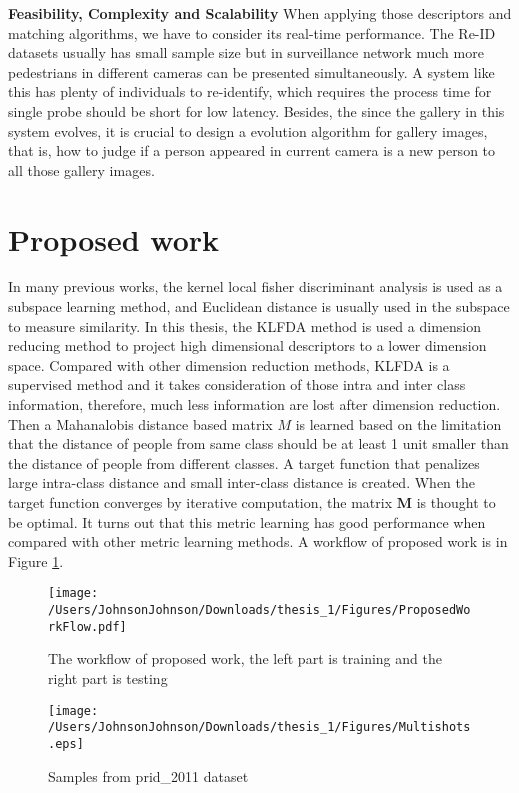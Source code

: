 \textbf{Feasibility, Complexity and Scalability} When applying those descriptors and matching algorithms, we have to consider its real-time performance. The Re-ID datasets usually has small sample size but in surveillance network much more pedestrians in different cameras can be presented simultaneously. A system like this has plenty of individuals to re-identify, which requires the process time for single probe should be short for low latency. Besides, the since the gallery in this system evolves, it is crucial to design a evolution algorithm for gallery images, that is, how to judge if a person appeared in current camera is a new person to all those gallery images.

\section{Proposed work}
In many previous works, the kernel local fisher discriminant analysis is used as a subspace learning method, and Euclidean distance is usually used in the subspace to measure similarity. In this thesis, the KLFDA \cite{KLFDA} method is used a dimension reducing method to project high dimensional descriptors to a lower dimension space. Compared with other dimension reduction methods, KLFDA is a supervised method and it takes consideration of those intra and inter class information, therefore, much less information are lost after dimension reduction. Then a Mahanalobis distance based matrix $M$ is learned based on the limitation that the distance of people from same class should be at least 1 unit smaller than the distance of people from different classes. A target function that penalizes large intra-class distance and small inter-class distance is created. When the target function converges by iterative computation, the matrix $\bm{M}$ is thought to be optimal. It turns out that this metric learning has good performance when compared with other metric learning methods. A workflow of proposed work is in Figure \ref{ProposedWorkflow}.

\begin{figure}[H]

\texttt{[image: /Users/JohnsonJohnson/Downloads/thesis\_1/Figures/ProposedWorkFlow.pdf]}
\vspace{-2em}
\caption{The workflow of proposed work, the left part is training and the right part is testing}
\label{ProposedWorkflow}

\end{figure}
\begin{figure}[H]

\texttt{[image: /Users/JohnsonJohnson/Downloads/thesis\_1/Figures/Multishots.eps]}
\vspace{-2em}
\caption{Samples from prid\_2011 dataset}

\end{figure}


